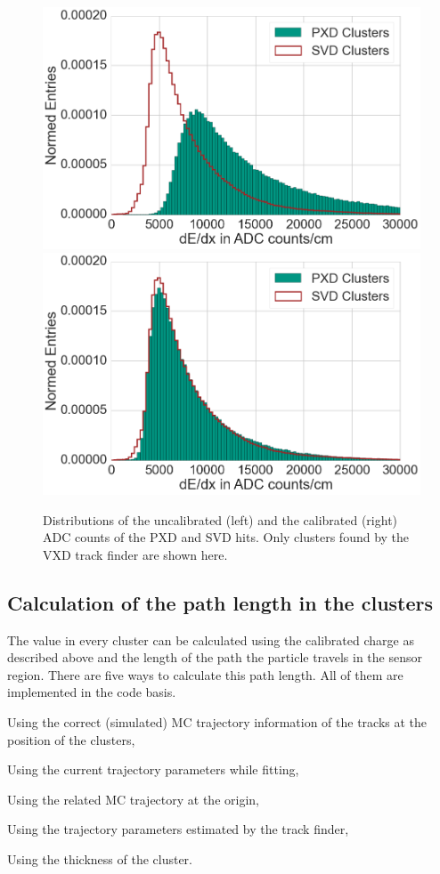 \begin{figure}
  \centering
 \includegraphics[width=0.48\linewidth]{figures/vxd/dEdXUncalibrated.png}
 \includegraphics[width=0.48\linewidth]{figures/vxd/dEdXCalibrated.png}
 \caption[Distributions of the uncalibrated and the calibrated ADC counts.]{Distributions of the uncalibrated (left) and the calibrated (right) ADC counts of the PXD and SVD hits. Only clusters found by the VXD track finder are shown here.}
 \label{fig-adc-count}
\end{figure}

\subsection{Calculation of the path length in the clusters} \label{subsection-calc}
The \dedx value in every cluster can be calculated using the calibrated charge as described above and the length of the path the particle travels in the sensor region. There are five ways to calculate this path length. All of them are implemented in the code basis.
\begin{zlist}
 \item Using the correct (simulated) MC trajectory information of the tracks at the position of the clusters, \label{list-mc}
 \item Using the current trajectory parameters while fitting,
 \item Using the related MC trajectory at the origin,
 \item Using the trajectory parameters estimated by the track finder,
 \item Using the thickness of the cluster.
\end{zlist}

